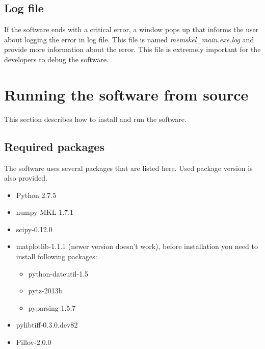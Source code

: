 \subsection{Log file}
If the software ends with a critical error, a window pops up that informs the user about logging the error in log file. This file is named \textit{memskel\_main.exe.log} and provide more information about the error. This file is extremely important for the developers to debug the software.

\section{Running the software from source}
This section describes how to install and run the software.
\subsection{Required packages}
The software uses several packages that are listed here. Used package version is also provided.
\begin{itemize}
	\item Python 2.7.5
	\item numpy-MKL-1.7.1
	\item scipy-0.12.0
	\item matplotlib-1.1.1 (newer version doesn't work), before installation you need to install following packages:
		\begin{itemize}
			\item python-dateutil-1.5
			\item pytz-2013b
			\item pyparsing-1.5.7
		\end{itemize}
	\item pylibtiff-0.3.0.dev82
	\item Pillov-2.0.0
\end{itemize}

